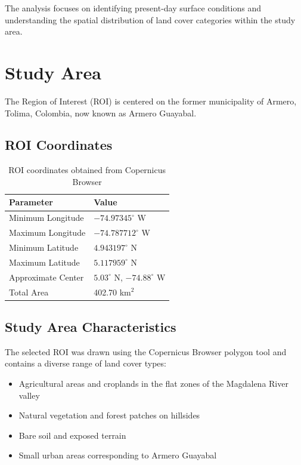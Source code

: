 \documentclass[12pt,a4paper]{article}
\begin{document}
The analysis focuses on identifying present-day surface conditions and understanding the spatial distribution of land cover categories within the study area.

\section{Study Area}

The Region of Interest (ROI) is centered on the former municipality of Armero, Tolima, Colombia, now known as Armero Guayabal.

\subsection{ROI Coordinates}

\begin{table}[H]
\centering
\begin{tabular}{|m{5cm}|m{7cm}|}
\hline
\textbf{Parameter} & \textbf{Value} \\
\hline
Minimum Longitude & $-74.97345^\circ$ W \\
\hline
Maximum Longitude & $-74.787712^\circ$ W \\
\hline
Minimum Latitude & $4.943197^\circ$ N \\
\hline
Maximum Latitude & $5.117959^\circ$ N \\
\hline
Approximate Center & $5.03^\circ$ N, $-74.88^\circ$ W \\
\hline
Total Area & 402.70 km$^2$ \\
\hline
\end{tabular}
\caption{ROI coordinates obtained from Copernicus Browser}
\end{table}

\subsection{Study Area Characteristics}

The selected ROI was drawn using the Copernicus Browser polygon tool and contains a diverse range of land cover types:

\begin{itemize}
    \item Agricultural areas and croplands in the flat zones of the Magdalena River valley
    \item Natural vegetation and forest patches on hillsides
    \item Bare soil and exposed terrain
    \item Small urban areas corresponding to Armero Guayabal
\end{itemize}
\end{document}

